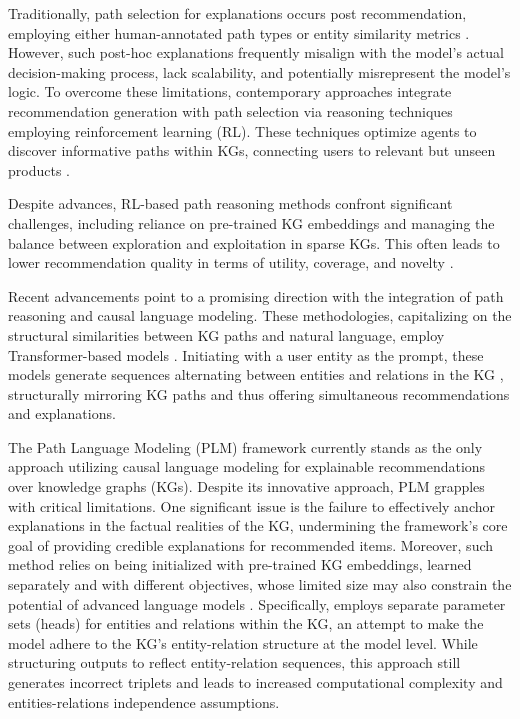 \documentclass[sigconf]{acmart}
\begin{document}
Traditionally, path selection for explanations occurs post recommendation, employing either human-annotated path types or entity similarity metrics \cite{Ai_2018, wang2018explainable}. However, such post-hoc explanations frequently misalign with the model's actual decision-making process, lack scalability, and potentially misrepresent the model's logic. To overcome these limitations, contemporary approaches integrate recommendation generation with path selection via reasoning techniques employing reinforcement learning (RL). These techniques optimize agents to discover informative paths within KGs, connecting users to relevant but unseen products \cite{10.1145/3331184.3331203, 10.1145/3340531.3412038, usercentric, liu2021reinforced, SAEBI202212, BALLOCCU2023110098}.

Despite advances, RL-based path reasoning methods confront significant challenges, including reliance on pre-trained KG embeddings and managing the balance between exploration and exploitation in sparse KGs. This often leads to lower recommendation quality in terms of utility, coverage, and novelty \cite{10.1007/978-3-031-28241-6_1}.

Recent advancements point to a promising direction with the integration of path reasoning and causal language modeling. These methodologies, capitalizing on the structural similarities between KG paths and natural language, employ Transformer-based models \cite{radford2019language, touvron2023llama}. Initiating with a user entity as the prompt, these models generate sequences alternating between entities and relations in the KG \cite{10.1145/3485447.3511937}, structurally mirroring KG paths and thus offering simultaneous recommendations and explanations.


\vspace{1mm}
The Path Language Modeling (PLM) framework \cite{10.1145/3485447.3511937} currently stands as the only approach utilizing causal language modeling for explainable recommendations over knowledge graphs (KGs). Despite its innovative approach, PLM grapples with critical limitations. One significant issue is the failure to effectively anchor explanations in the factual realities of the KG, undermining the framework's core goal of providing credible explanations for recommended items. Moreover, such method relies on being initialized with pre-trained KG embeddings, learned separately and with different objectives, whose limited size may also constrain the potential of advanced language models \cite{radford2019language}. Specifically, \cite{10.1145/3485447.3511937} employs separate parameter sets (heads) for entities and relations within the KG, an attempt to make the model adhere to the KG's entity-relation structure at the model level. While structuring outputs to reflect entity-relation sequences, this approach still generates incorrect triplets and leads to increased computational complexity and entities-relations independence assumptions.
\end{document}
